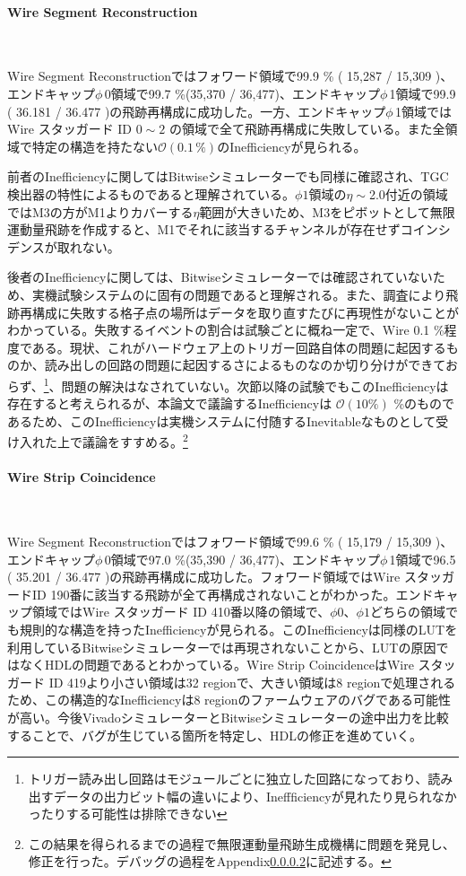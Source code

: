 \paragraph{Wire Segment Reconstruction}　　
\par
Wire Segment Reconstructionではフォワード領域で99.9 \% ( 15,287 / 15,309 )、エンドキャップ$\phi\,$0領域で99.7 \%(35,370 / 36,477)、エンドキャップ$\phi\,$1領域で99.9 ( 36.181 / 36.477 )の飛跡再構成に成功した。一方、エンドキャップ$\phi\,$1領域ではWire スタッガード ID $0 \sim 2$ の領域で全て飛跡再構成に失敗している。また全領域で特定の構造を持たない$\mathcal{O}(0.1\,\%)$のInefficiencyが見られる。

前者のInefficiencyに関してはBitwiseシミュレーターでも同様に確認され、TGC検出器の特性によるものであると理解されている。$\phi1$領域の$\eta\sim$2.0付近の領域ではM3の方がM1よりカバーする$\eta$範囲が大きいため、M3をピボットとして無限運動量飛跡を作成すると、M1でそれに該当するチャンネルが存在せずコインシデンスが取れない。

後者のInefficiencyに関しては、Bitwiseシミュレーターでは確認されていないため、実機試験システムのに固有の問題であると理解される。また、調査により飛跡再構成に失敗する格子点の場所はデータを取り直すたびに再現性がないことがわかっている。失敗するイベントの割合は試験ごとに概ね一定で、Wire 0.1 \%程度である。現状、これがハードウェア上のトリガー回路自体の問題に起因するものか、読み出しの回路の問題に起因するさによるものなのか切り分けができておらず、\footnote{トリガー読み出し回路はモジュールごとに独立した回路になっており、読み出すデータの出力ビット幅の違いにより、Ineffficiencyが見れたり見られなかったりする可能性は排除できない}、問題の解決はなされていない。次節以降の試験でもこのInefficiencyは存在すると考えられるが、本論文で議論するInefficiencyは $\mathcal{O}(10 \%)$ \%のものであるため、このInefficiencyは実機システムに付随するInevitableなものとして受け入れた上で議論をすすめる。\footnote{この結果を得られるまでの過程で無限運動量飛跡生成機構に問題を発見し、修正を行った。デバッグの過程をAppendix\ref{}に記述する。}


\paragraph{Wire Strip Coincidence}　　
\par
Wire Segment Reconstructionではフォワード領域で99.6 \% ( 15,179 / 15,309 )、エンドキャップ$\phi\,$0領域で97.0 \%(35,390 / 36,477)、エンドキャップ$\phi\,$1領域で96.5 ( 35.201 / 36.477 )の飛跡再構成に成功した。フォワード領域ではWire スタッガードID 190番に該当する飛跡が全て再構成されないことがわかった。エンドキャップ領域ではWire スタッガード ID 410番以降の領域で、$\phi0$、$\phi1$どちらの領域でも規則的な構造を持ったInefficiencyが見られる。このInefficiencyは同様のLUTを利用しているBitwiseシミュレーターでは再現されないことから、LUTの原因ではなくHDLの問題であるとわかっている。Wire Strip CoincidenceはWire スタッガード ID 419より小さい領域は32 regionで、大きい領域は8 regionで処理されるため、この構造的なInefficiencyは8 regionのファームウェアのバグである可能性が高い。今後VivadoシミュレーターとBitwiseシミュレーターの途中出力を比較することで、バグが生じている箇所を特定し、HDLの修正を進めていく。


